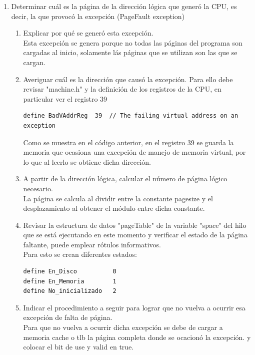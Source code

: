 \documentclass[11pt]{article}
\begin{document}
  \begin{enumerate}
    \item  Determinar cuál es la página de la dirección lógica que generó la CPU, es decir, la que provocó la excepción (PageFault exception)
    \begin{enumerate}
      \item Explicar por qué se generó esta excepción.\\
      Esta excepción se genera porque no todas las páginas del programa son cargadas al inicio, solamente lás páginas que se utilizan son las que se cargan.
      \item Averiguar cuál es la dirección que causó la excepción. Para ello debe revisar "machine.h" y la definición de los registros de la CPU, en particular ver el registro 39 \\
      \begin{lstlisting}
define BadVAddrReg	39	// The failing virtual address on an exception
      \end{lstlisting}
      Como se muestra en el código anterior, en el registro 39 se guarda la memoria que ocasiona una excepción de manejo de memoria virtual, por lo que al leerlo se obtiene dicha dirección.
      
      \item  A partir de la dirección lógica, calcular el número de página lógico necesario.\\
      La página se calcula al dividir entre la constante pagesize y el desplazamiento al obtener el módulo entre dicha constante.
      
      \item Revisar la estructura de datos "pageTable" de la variable "space" del hilo que se está ejecutando en este momento y verificar el estado de la página faltante, puede emplear rótulos informativos.\\
      Para esto se crean diferentes estados:
      \begin{lstlisting}
define En_Disco          0
define En_Memoria        1
define No_inicializado   2
      \end{lstlisting}
      
      \item     Indicar el procedimiento a seguir para lograr que no vuelva a ocurrir esa excepción de falta de página.\\
      Para que no vuelva a ocurrir dicha excepción se debe de cargar a memoria cache o tlb la página completa donde se ocacionó la excepción. y colocar el bit de use y valid en true.
      
    \end{enumerate}
  \end{enumerate}
\end{document}
